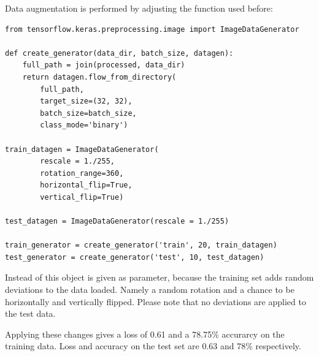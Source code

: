 Data augmentation is performed by adjusting the  function used before:

\begin{lstlisting}
from tensorflow.keras.preprocessing.image import ImageDataGenerator

def create_generator(data_dir, batch_size, datagen):
    full_path = join(processed, data_dir)
    return datagen.flow_from_directory(
        full_path,
        target_size=(32, 32),
        batch_size=batch_size,
        class_mode='binary')

train_datagen = ImageDataGenerator(
        rescale = 1./255,
        rotation_range=360,
        horizontal_flip=True,
        vertical_flip=True)

test_datagen = ImageDataGenerator(rescale = 1./255)

train_generator = create_generator('train', 20, train_datagen)
test_generator = create_generator('test', 10, test_datagen)
\end{lstlisting}

Instead of  this object is given as parameter, because the training set adds random deviations to the data loaded. Namely a random rotation and a chance to be horizontally and vertically flipped.
Please note that no deviations are applied to the test data.

Applying these changes gives a loss of 0.61 and a 78.75\% accurarcy on the training data.
Loss and accuracy on the test set are 0.63 and 78\% respectively.


